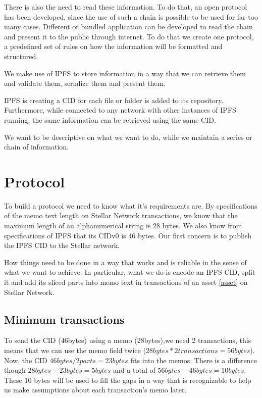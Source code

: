 \documentclass[10pt,a4paper]{paper}
\begin{document}
	There is also the need to read these information. To do that, an open protocol has been developed, since the use of such a chain is possible to be used for far too many cases. Different or bundled application can be developed to read the chain and present it to the public through internet. To do that we create one protocol, a predefined set of rules on how the information will be formatted and structured.
	
	We make use of IPFS to store information in a way that we can retrieve them and validate them, serialize them and present them.
	
	IPFS is creating a CID for each file or folder is added to its repository. Furthermore, while connected to any network with other instances of IPFS running, the same information can be retrieved using the same CID.
	
	We want to be descriptive on what we want to do, while we maintain a series or chain of information.

	\section{Protocol}\label{protocol}
	To build a protocol we need to know what it's requirements are. By specifications of the memo text length on Stellar Network transactions, we know that the maximum length of an alphanumerical string is 28 bytes. We also know from specifications of IPFS that its CIDv0 is 46 bytes. Our first concern is to publish the IPFS CID to the Stellar network.
	
	How things need to be done in a way that works and is reliable in the sense of what we want to achieve. In particular, what we do is encode an IPFS CID, split it and add its sliced parts into memo text in transactions of an asset \ref{asset} on Stellar Network.
	

	\subsection{Minimum transactions}\label{minimum_transactions}
	To send the CID (46bytes) using a memo (28bytes),we need 2 transactions, this means that we can use the memo field twice ($ 28bytes*2transactions=56bytes $). Now, the CID $ 46bytes/2parts=23bytes $ fits into the memos. There is a difference though $ 28bytes-23bytes=5bytes $ and a total of $56bytes-46bytes=10bytes$. These 10 bytes will be used to fill the gaps in a way that is recognizable to help us make assumptions about each transaction's memo later.
	
\end{document}
